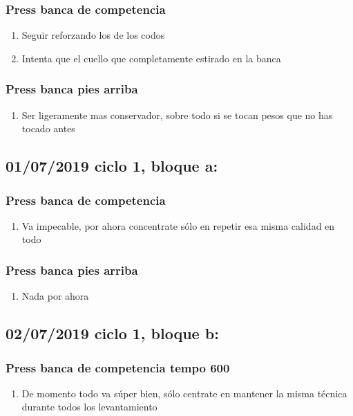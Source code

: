 \documentclass[11pt]{article}
\begin{document}
\subsubsection{Press banca de competencia}
\label{sec:orga0c0959}
\begin{enumerate}
\item Seguir reforzando los de los codos
\item Intenta que el cuello que completamente estirado en la banca
\end{enumerate}
\subsubsection{Press banca pies arriba}
\label{sec:org32426bd}
\begin{enumerate}
\item Ser ligeramente mas conservador, sobre todo si se tocan pesos que
no has tocado antes
\end{enumerate}
\subsection{01/07/2019 ciclo 1, bloque a:}
\label{sec:org6c25f1b}
\subsubsection{Press banca de competencia}
\label{sec:orge8c46f3}
\begin{enumerate}
\item Va impecable, por ahora concentrate sólo en repetir esa misma
calidad en todo
\end{enumerate}
\subsubsection{Press banca pies arriba}
\label{sec:org9b9a657}
\begin{enumerate}
\item Nada por ahora
\end{enumerate}
\subsection{02/07/2019 ciclo 1, bloque b:}
\label{sec:org1e1ae22}
\subsubsection{Press banca de competencia tempo 600}
\label{sec:orgf62ef9a}
\begin{enumerate}
\item De momento todo va súper bien, sólo centrate en mantener la misma
técnica durante todos los levantamiento
\end{enumerate}
\end{document}
